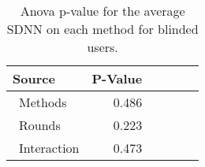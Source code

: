 
\begin{table}[H]
\centering
\caption{Anova p-value for the average SDNN on each method for blinded users.}
\label{tab:blocdanova_sdnn_two_way_blind}
\begin{tabular}{lrrrrr}
\toprule
          Source & P-Value \\
\midrule
    \    Methods &   0.486 \\
     \    Rounds &   0.223 \\
\    Interaction &   0.473 \\
\bottomrule
\end{tabular}
\end{table}

